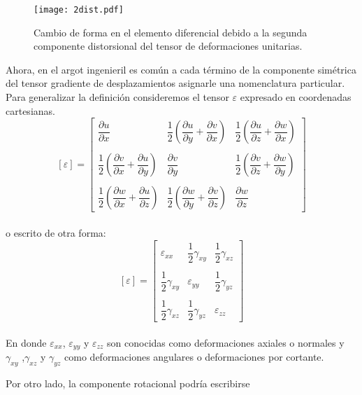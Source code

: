 \documentclass[../notas medios.tex]{subfiles}
\begin{document}
\begin{figure}[H]
\centering
	\texttt{[image: 2dist.pdf]}
	\caption{Cambio de forma en el elemento diferencial debido a la segunda componente distorsional del tensor de deformaciones unitarias.}
	\label{2dist}
\end{figure}

Ahora, en el argot ingenieril es común a cada término de la componente simétrica del tensor gradiente de desplazamientos asignarle una nomenclatura particular. Para generalizar la definición consideremos el tensor $\varepsilon$ expresado en coordenadas cartesianas. 
\[	
[\varepsilon] =
\begin{bmatrix}
	\dfrac{\partial u}{\partial x} & \dfrac{1}{2} \left(\dfrac{\partial u}{\partial y} + \dfrac{\partial v}{\partial x}\right)  & \dfrac{1}{2} \left(\dfrac{\partial u}{\partial z} + \dfrac{\partial w}{\partial x}\right) \\\\
	\dfrac{1}{2} \left( \dfrac{\partial v}{\partial x} + \dfrac{\partial u}{\partial y} \right)  & \dfrac{\partial v}{\partial y} & \dfrac{1}{2} \left(\dfrac{\partial v}{\partial z}+\dfrac{\partial w}{\partial y}\right) \\\\
	 \dfrac{1}{2} \left(\dfrac{\partial w}{\partial x} + \dfrac{\partial u}{\partial z} \right) & \dfrac{1}{2} \left(\dfrac{\partial w}{\partial y} + \dfrac{\partial v}{\partial z}\right)  & \dfrac{\partial w}{\partial z}
\end{bmatrix}\]\\

o escrito de otra forma: 
\[	
[\varepsilon] =
\begin{bmatrix}
	\varepsilon_{xx} & \dfrac{1}{2} \gamma_{xy} & \dfrac{1}{2} \gamma_{xz}  \\\\
	\dfrac{1}{2} \gamma_{xy}  & \varepsilon_{yy} & \dfrac{1}{2}  \gamma_{yz}  \\\\
	 \dfrac{1}{2} \gamma_{xz} & \dfrac{1}{2} \gamma_{yz}  &  \varepsilon_{zz}
\end{bmatrix}\]\\

En donde $\varepsilon_{xx}$, $\varepsilon_{yy}$ y $\varepsilon_{zz}$ son conocidas como deformaciones axiales o normales y  $\gamma_{xy}$ ,$ \gamma_{xz}$  y $\gamma_{yz}$  como deformaciones angulares o deformaciones por cortante. 

Por otro lado, la componente rotacional podría escribirse 
\end{document}
